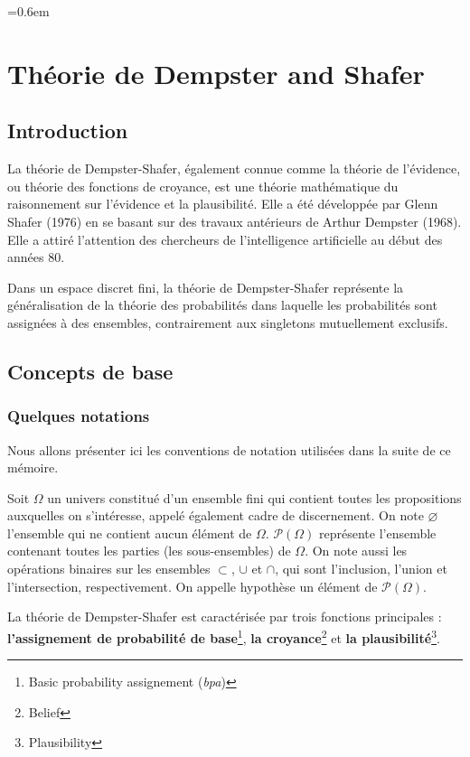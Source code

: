 \parskip=0.6em
\chapter{Théorie de Dempster and Shafer}

{}
\section*{Introduction}

La théorie de Dempster-Shafer, également connue comme la théorie de l'évidence,
ou théorie des fonctions de croyance, est une théorie mathématique du raisonnement
sur l’évidence et la plausibilité. Elle a été développée par Glenn Shafer (1976)
en se basant sur des travaux antérieurs de Arthur Dempster (1968). Elle a attiré
l’attention des chercheurs de l'intelligence artificielle au début des années 80.

Dans un espace discret fini, la théorie de Dempster-Shafer représente la généralisation
de la théorie des probabilités dans laquelle les probabilités sont assignées à des ensembles,
contrairement aux singletons mutuellement exclusifs.

\section{Concepts de base}

\subsection{Quelques notations}

Nous allons présenter ici les conventions de notation utilisées dans la suite de ce mémoire.

Soit $\Omega$ un univers constitué d'un ensemble fini qui contient toutes les propositions
auxquelles on s'intéresse, appelé également cadre de discernement. On note $\varnothing$
l’ensemble qui ne contient aucun élément de $\Omega$. $\mathcal{P}(\Omega)$ représente
l’ensemble contenant toutes les parties (les sous-ensembles) de $\Omega$. On note aussi
les opérations binaires sur les ensembles $\subset$, $\cup$ et $\cap$, qui sont l’inclusion,
l’union et l’intersection, respectivement. On appelle hypothèse un élément de $\mathcal{P}(\Omega)$.

La théorie de Dempster-Shafer est caractérisée par trois fonctions principales :
\textbf{l’assignement de probabilité de base}\footnote{Basic probability assignement (\emph{bpa})},
\textbf{la croyance}\footnote{Belief} et \textbf{la plausibilité}\footnote{Plausibility}.

